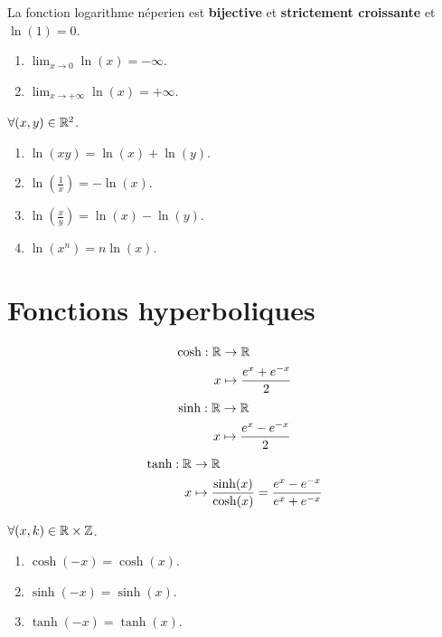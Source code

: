\begin{proposition}
	La fonction logarithme néperien est \textbf{bijective} et \textbf{strictement croissante} et $\ln(1) = 0$.
    \begin{multicols}{2}
        \begin{enumerate}
            \item $\lim_{x \to 0} \ln(x) = -\infty$.
            \item $\lim_{x \to +\infty} \ln(x) = +\infty$.
        \end{enumerate}
    \end{multicols}
    \noindent $\forall (x, y) \in \mathbb{R}^2$.
    \begin{multicols}{2}
        \begin{enumerate}
            \item $\ln(xy) = \ln(x) + \ln(y)$.
            \item $\ln(\frac{1}{x}) = -\ln(x)$.
            \item $\ln(\frac{x}{y}) = \ln(x) - \ln(y)$.
            \item $\ln(x^n) = n\ln(x)$.
        \end{enumerate}
    \end{multicols}
\end{proposition}

\section{Fonctions hyperboliques}

\begin{definition}
	\begin{align*}
		\cosh : \mathbb{R} &\to \mathbb{R} \\
		         x &\mapsto \frac{e^x + e^{-x}}{2}
	\end{align*}
	\begin{align*}
		\sinh : \mathbb{R} &\to \mathbb{R} \\ 
			     x &\mapsto \frac{e^x - e^{-x}}{2}
	\end{align*}
	\begin{align*}
		\tanh : \mathbb{R} &\to \mathbb{R} \\ 
				 x &\mapsto \frac{\sinh(x)}{\cosh(x)} = \frac{e^x - e^{-x}}{e^x + e^{-x}}
	\end{align*}
\end{definition}

\begin{proposition}
	$\forall (x,k) \in \mathbb{R} \times \mathbb{Z}$.
	\begin{enumerate}
		\item $\cosh(-x) = \cosh(x)$.
		\item $\sinh(-x) = \sinh(x)$.
		\item $\tanh(-x) = \tanh(x)$.
	\end{enumerate}
\end{proposition}

